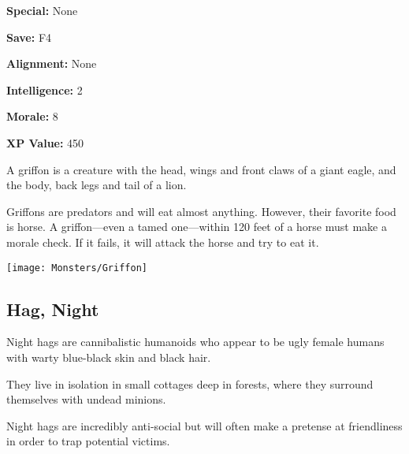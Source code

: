 \begin{multicols*}{2}
{\textbf{Special:} None

\textbf{Save:} F4

\textbf{Alignment:} None

\textbf{Intelligence:} 2

\textbf{Morale:} 8

\textbf{XP Value:} 450}

A griffon is a creature with the head, wings and front claws of a giant eagle, and the body, back legs and tail of a lion.

Griffons are predators and will eat almost anything. However, their favorite food is horse. A griffon—even a tamed one—within 120 feet of a horse must make a morale check. If it fails, it will attack the horse and try to eat it.

\texttt{[image: Monsters/Griffon]}

\subsection{Hag, Night}

Night hags are cannibalistic humanoids who appear to be ugly female humans with warty blue-black skin and black hair.

They live in isolation in small cottages deep in forests, where they surround themselves with undead minions.

Night hags are incredibly anti-social but will often make a pretense at friendliness in order to trap potential victims.


\end{multicols*}
